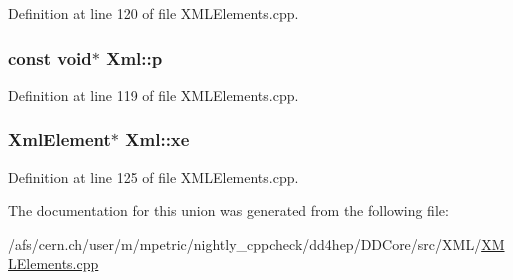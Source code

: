 Definition at line 120 of file XMLElements.cpp.\hypertarget{union_xml_a1049a06460eb8ee2878b7ced0fdb19e8}{
\subsubsection[{p}]{\setlength{\rightskip}{0pt plus 5cm}const void$\ast$ {\bf Xml::p}}}
\label{union_xml_a1049a06460eb8ee2878b7ced0fdb19e8}


Definition at line 119 of file XMLElements.cpp.\hypertarget{union_xml_abd997a186caa27d85c309989aceb690f}{
\subsubsection[{xe}]{\setlength{\rightskip}{0pt plus 5cm}XmlElement$\ast$ {\bf Xml::xe}}}
\label{union_xml_abd997a186caa27d85c309989aceb690f}


Definition at line 125 of file XMLElements.cpp.

The documentation for this union was generated from the following file:\begin{DoxyCompactItemize}
\item 
/afs/cern.ch/user/m/mpetric/nightly\_\-cppcheck/dd4hep/DDCore/src/XML/\hyperlink{_x_m_l_elements_8cpp}{XMLElements.cpp}\end{DoxyCompactItemize}
